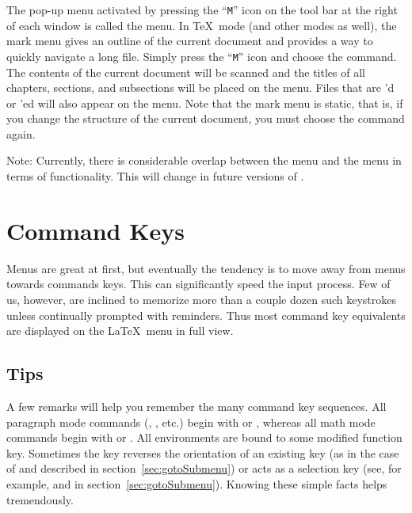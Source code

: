 \documentclass{report}
\begin{document}
The pop-up menu activated by pressing the ``\texttt{M}'' icon on the 
tool bar at the right of each window is called the  menu.  
In \TeX\ mode (and other modes as well), the mark menu gives an 
outline of the current document and provides a way to quickly navigate 
a long file.  Simply press the ``\texttt{M}'' icon and choose the 
 command.  The contents of the current document will 
be scanned and the titles of all chapters, sections, and subsections 
will be placed on the menu.  Files that are 'd or 
'ed will also appear on the  menu.  Note that 
the mark menu is static, that is, if you change the structure of the 
current document, you must choose the  command 
again.

Note: Currently, there is considerable overlap between the 
 menu and the  menu in terms of 
functionality.  This will change in future versions of \Alpha.


\chapter{Command Keys}

Menus are great at first, but eventually the tendency is to move away 
from menus towards commands keys.  This can significantly speed the 
input process.  Few of us, however, are inclined to memorize more than 
a couple dozen such keystrokes unless continually prompted with 
reminders.  Thus most command key equivalents are displayed on the 
\LaTeX\ menu in full view.

\section{Tips}
\label{sec:keys}

A few remarks will help you remember the many command key sequences.  
All paragraph mode commands (, , etc.)  
begin with  or , whereas all math mode 
commands begin with  or .  All 
environments are bound to some modified function key.  Sometimes the 
 key reverses the orientation of an existing key (as in the 
case of  and  described in 
section~\ref{sec:gotoSubmenu}) or acts as a selection key (see, for 
example,  and  in 
section~\ref{sec:gotoSubmenu}).  Knowing these simple facts helps 
tremendously.
\end{document}

